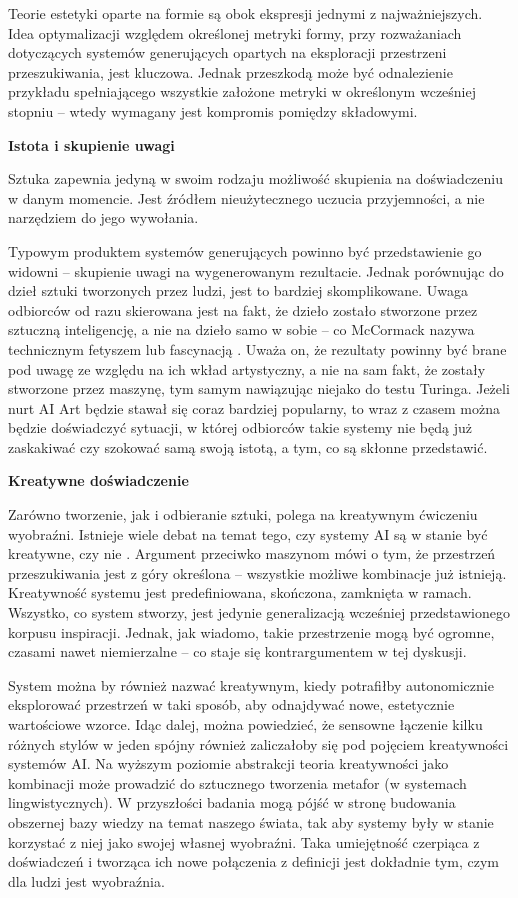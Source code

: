 \documentclass[12pt]{article}
\begin{document}
Teorie estetyki oparte na formie są obok ekspresji jednymi z najważniejszych. Idea optymalizacji względem określonej metryki formy, przy rozważaniach dotyczących systemów generujących opartych na eksploracji przestrzeni przeszukiwania, jest kluczowa. Jednak przeszkodą może być odnalezienie przykładu spełniającego wszystkie założone metryki w określonym wcześniej stopniu – wtedy wymagany jest kompromis pomiędzy składowymi.

\noindent\textbf{Istota i skupienie uwagi}

Sztuka zapewnia jedyną w swoim rodzaju możliwość skupienia na doświadczeniu w danym momencie. Jest źródłem nieużytecznego uczucia przyjemności, a nie narzędziem do jego wywołania.

Typowym produktem systemów generujących powinno być przedstawienie go widowni – skupienie uwagi na wygenerowanym rezultacie. Jednak porównując do dzieł sztuki tworzonych przez ludzi, jest to bardziej skomplikowane. Uwaga odbiorców od razu skierowana jest na fakt, że dzieło zostało stworzone przez sztuczną inteligencję, a nie na dzieło samo w sobie – co McCormack nazywa technicznym fetyszem lub fascynacją \cite{20}. Uważa on, że rezultaty powinny być brane pod uwagę ze względu na ich wkład artystyczny, a nie na sam fakt, że zostały stworzone przez maszynę, tym samym nawiązując niejako do testu Turinga. Jeżeli nurt AI Art będzie stawał się coraz bardziej popularny, to wraz z czasem można będzie doświadczyć sytuacji, w której odbiorców takie systemy nie będą już zaskakiwać czy szokować samą swoją istotą, a tym, co są skłonne przedstawić.

\noindent\textbf{Kreatywne doświadczenie}

Zarówno tworzenie, jak i odbieranie sztuki, polega na kreatywnym ćwiczeniu wyobraźni. Istnieje wiele debat na temat tego, czy systemy AI są w stanie być kreatywne, czy nie \cite{20}. Argument przeciwko maszynom mówi o tym, że przestrzeń przeszukiwania jest z góry określona – wszystkie możliwe kombinacje już istnieją. Kreatywność systemu jest predefiniowana, skończona, zamknięta w ramach. Wszystko, co system stworzy, jest jedynie generalizacją wcześniej przedstawionego korpusu inspiracji. Jednak, jak wiadomo, takie przestrzenie mogą być ogromne, czasami nawet niemierzalne – co staje się kontrargumentem w tej dyskusji.

System można by również nazwać kreatywnym, kiedy potrafiłby autonomicznie eksplorować przestrzeń w taki sposób, aby odnajdywać nowe, estetycznie wartościowe wzorce. Idąc dalej, można powiedzieć, że sensowne łączenie kilku różnych stylów w jeden spójny również zaliczałoby się pod pojęciem kreatywności systemów AI. Na wyższym poziomie abstrakcji teoria kreatywności jako kombinacji może prowadzić do sztucznego tworzenia metafor (w systemach lingwistycznych). W przyszłości badania mogą pójść w stronę budowania obszernej bazy wiedzy na temat naszego świata, tak aby systemy były w stanie korzystać z niej jako swojej własnej wyobraźni. Taka umiejętność czerpiąca z doświadczeń i tworząca ich nowe połączenia z definicji jest dokładnie tym, czym dla ludzi jest wyobraźnia.
\end{document}
